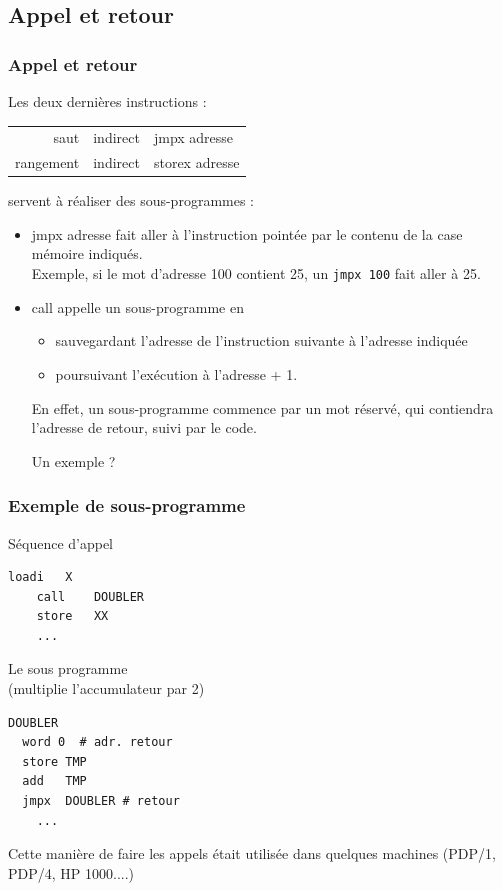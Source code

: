 \subsection{Appel et retour}
\begin{frame}
  \frametitle{Appel et retour}
Les deux dernières instructions :
\begin{center}
\begin{tabular}{|rll|}
\hline
saut  &indirect & \alert{jmpx adresse} \\
rangement  &indirect & \alert{storex adresse} \\
\hline
\end{tabular}
\end{center}
servent à réaliser des sous-programmes :

\begin{itemize}
\item 
\alert{jmpx adresse} fait aller à l'instruction pointée par le contenu de la case mémoire indiqués. \\
Exemple, si le mot
d'adresse 100 contient 25, un \texttt{jmpx 100} fait aller à 25.
\item 
\alert{call} appelle un sous-programme en 
\begin{itemize}
\item sauvegardant l'adresse de l'instruction suivante à l'adresse indiquée
\item poursuivant l'exécution à l'adresse + 1.
\end{itemize}
En effet, un sous-programme commence par un mot réservé, qui
contiendra l'adresse de retour, suivi par le code.

Un exemple ?
\end{itemize}
\end{frame}

\begin{frame}[containsverbatim]
\frametitle{Exemple de sous-programme}
\begin{multicols}{2}

\alert{Séquence d'appel}
\begin{lstlisting}[frame=single]
    loadi   X      
    call    DOUBLER
    store   XX
    ...
\end{lstlisting}
\break
\alert{Le sous programme}\\
 (multiplie l'accumulateur par 2)
\begin{lstlisting}[frame=single]
DOUBLER
  word 0  # adr. retour
  store TMP
  add   TMP
  jmpx  DOUBLER # retour
    ...
\end{lstlisting}
\end{multicols}

Cette manière de faire les appels était utilisée dans quelques
machines (PDP/1, PDP/4, HP 1000....)
\end{frame}


